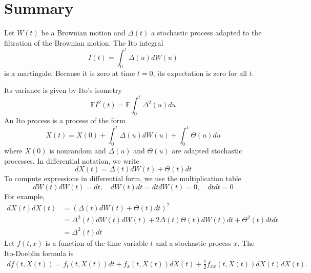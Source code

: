 \documentclass[\topdir/lecture\_notes.tex]{subfiles}
\begin{document}
\section{Summary}
Let \(W(t)\) be a Brownian motion and \(\Delta(t)\) a stochastic process adapted to the filtration of the Brownian motion. The Ito integral
\begin{equation*}
I(t)=\int_{0}^{t} \Delta(u) d W(u) \label{4.8.1}
\end{equation*}
is a martingale. Because it is zero at time \(t=0\), its expectation is zero for all \(t\). 

Its variance is given by Ito's isometry
\begin{equation*}
\mathbb{E} I^{2}(t)=\mathbb{E} \int_{0}^{t} \Delta^{2}(u) d u \label{4.8.2}
\end{equation*}
An Ito process is a process of the form
\begin{equation*}
X(t)=X(0)+\int_{0}^{t} \Delta(u) d W(u)+\int_{0}^{t} \Theta(u) d u \label{4.8.4}
\end{equation*}
where \(X(0)\) is nonrandom and \(\Delta(u)\) and \(\Theta(u)\) are adapted stochastic processes. In differential notation, we write
\begin{equation*}
d X(t)=\Delta(t) d W(t)+\Theta(t) d t
\end{equation*}
To compute expressions in differential form, we use the multiplication table
\begin{equation*}
d W(t) d W(t)=d t, \quad d W(t) d t=d t d W(t)=0, \quad d t d t=0
\end{equation*}
For example,
\begin{align*}
dX(t) dX(t) & =(\Delta(t) dW(t)+\Theta(t) dt)^{2} \\
& =\Delta^{2}(t) dW(t) dW(t)+2 \Delta(t) \Theta(t) dW(t) dt+\Theta^{2}(t) dt dt \\
& =\Delta^{2}(t) dt
\end{align*}
Let \(f(t, x)\) is a function of the time variable \(t\) and a stochastic process \(x\). The Ito-Doeblin formula is
\begin{align*}
    df(t, X(t))=f_{t}(t, X(t)) d t+f_{x}(t, X(t)) d X(t)+\frac{1}{2} f_{x x}(t, X(t)) dX(t) dX(t).
\end{align*}
\end{document}
